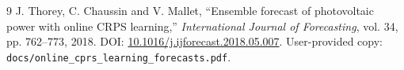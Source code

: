\documentclass[11pt,a4paper]{article}
\newcommand{\code}[1]{\nolinkurl{#1}}
\begin{document}
\begin{thebibliography}{9}
 J. Thorey, C. Chaussin and V. Mallet, ``Ensemble forecast of photovoltaic power with online CRPS learning,'' \emph{International Journal of Forecasting}, vol. 34, pp. 762--773, 2018. DOI: \href{https://doi.org/10.1016/j.ijforecast.2018.05.007}{10.1016/j.ijforecast.2018.05.007}. User-provided copy: \code{docs/online_cprs_learning_forecasts.pdf}.
\end{thebibliography}
\end{document}
